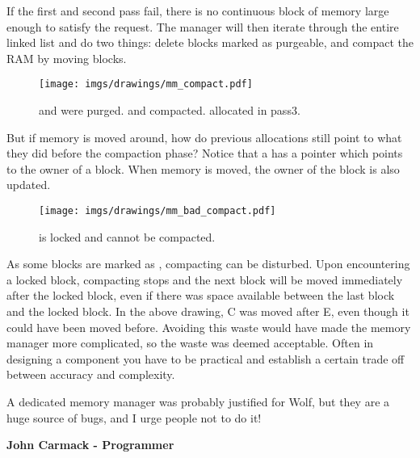 \documentclass[book.tex]{subfiles}
\begin{document}
 \par
 If the first and second pass fail, there is no continuous block of memory large enough to satisfy the request. The manager will then iterate through the entire linked list and do two things: delete blocks marked as purgeable, and compact the RAM by moving blocks.
  \par
\begin{figure}[H]
\centering
 \texttt{[image: imgs/drawings/mm\_compact.pdf]}
  \caption{ and  were purged.  and  compacted.  allocated in pass3.}
 \end{figure}
 \par
But if memory is moved around, how do previous allocations still point to what they did before the compaction phase? Notice that a  has a  pointer which points to the owner of a block.  When memory is moved, the owner of the block is also updated.

   \par
\begin{figure}[H]
\centering
 \texttt{[image: imgs/drawings/mm\_bad\_compact.pdf]}
 \caption{ is locked and cannot be compacted.}
 \end{figure}
 \par
 As some blocks are marked as , compacting can be disturbed. Upon encountering a locked block, compacting stops and the next block will be moved immediately after the locked block, even if there was space available between the last block and the locked block. In the above drawing, C was moved after E, even though it could have been moved before. Avoiding this waste would have made the memory manager more complicated, so the waste was deemed acceptable. Often in designing a component you have to be practical and establish a certain trade off between accuracy and complexity.



\begin{fancyquotes}
A dedicated memory manager was probably justified for Wolf, but they are a huge source of bugs, and I urge people not to do it!
\par
\textbf{John Carmack - Programmer}
 \end{fancyquotes}
\end{document}
